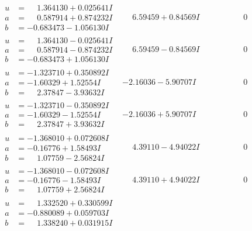 \documentclass[1p]{elsarticle_modified}
\theoremstyle{definition}
\begin{document}
$$\begin{array}{c|c|c}
\begin{aligned}
u &= \phantom{-}1.364130 + 0.025641 I \\
a &= \phantom{-}0.587914 + 0.874232 I \\
b &= -0.683473 - 1.056130 I\end{aligned}
 & \phantom{-}6.59459 + 0.84569 I & \phantom{-0.000000 } 0 \\ \hline\begin{aligned}
u &= \phantom{-}1.364130 - 0.025641 I \\
a &= \phantom{-}0.587914 - 0.874232 I \\
b &= -0.683473 + 1.056130 I\end{aligned}
 & \phantom{-}6.59459 - 0.84569 I & \phantom{-0.000000 } 0 \\ \hline\begin{aligned}
u &= -1.323710 + 0.350892 I \\
a &= -1.60329 + 1.52554 I \\
b &= \phantom{-}2.37847 - 3.93632 I\end{aligned}
 & -2.16036 - 5.90707 I & \phantom{-0.000000 } 0 \\ \hline\begin{aligned}
u &= -1.323710 - 0.350892 I \\
a &= -1.60329 - 1.52554 I \\
b &= \phantom{-}2.37847 + 3.93632 I\end{aligned}
 & -2.16036 + 5.90707 I & \phantom{-0.000000 } 0 \\ \hline\begin{aligned}
u &= -1.368010 + 0.072608 I \\
a &= -0.16776 + 1.58493 I \\
b &= \phantom{-}1.07759 - 2.56824 I\end{aligned}
 & \phantom{-}4.39110 - 4.94022 I & \phantom{-0.000000 } 0 \\ \hline\begin{aligned}
u &= -1.368010 - 0.072608 I \\
a &= -0.16776 - 1.58493 I \\
b &= \phantom{-}1.07759 + 2.56824 I\end{aligned}
 & \phantom{-}4.39110 + 4.94022 I & \phantom{-0.000000 } 0 \\ \hline\begin{aligned}
u &= \phantom{-}1.332520 + 0.330599 I \\
a &= -0.880089 + 0.059703 I \\
b &= \phantom{-}1.338240 + 0.031915 I\end{aligned}

\end{array}$$
\end{document}
